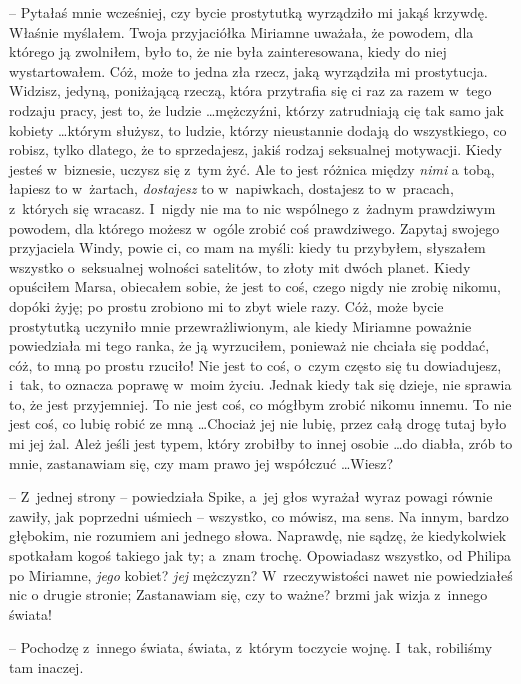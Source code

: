 \documentclass[oneside,polish,11pt,rmheadings]{mwbk}
\begin{document}
-- Pytałaś mnie wcześniej, czy bycie prostytutką wyrządziło mi jakąś krzywdę. Właśnie myślałem. Twoja przyjaciółka Miriamne uważała, że powodem, dla którego ją zwolniłem, było to, że nie była zainteresowana, kiedy do niej wystartowałem.  Cóż, może to jedna zła rzecz, jaką wyrządziła mi prostytucja. Widzisz, jedyną, poniżającą rzeczą, która przytrafia się ci raz za razem w~tego rodzaju pracy, jest to, że ludzie \ldots  mężczyźni, którzy zatrudniają cię tak samo jak kobiety \ldots  którym służysz, to ludzie, którzy nieustannie dodają do wszystkiego, co robisz, tylko dlatego, że to sprzedajesz, jakiś rodzaj seksualnej motywacji. Kiedy jesteś w~biznesie, uczysz się z~tym żyć. Ale to jest różnica między \textit{nimi }a tobą, łapiesz to w~żartach, \textit{dostajesz }to w~napiwkach, dostajesz to w~pracach, z~których się wracasz. I~nigdy nie ma to nic wspólnego z~żadnym prawdziwym powodem, dla którego możesz w~ogóle zrobić coś prawdziwego. Zapytaj swojego przyjaciela Windy, powie ci, co mam na myśli: kiedy tu przybyłem, słyszałem wszystko o~seksualnej wolności satelitów, to złoty mit dwóch planet. Kiedy opuściłem Marsa, obiecałem sobie, że jest to coś, czego nigdy nie zrobię nikomu, dopóki żyję; po prostu zrobiono mi to zbyt wiele razy. Cóż, może bycie prostytutką uczyniło mnie przewrażliwionym, ale kiedy Miriamne poważnie powiedziała mi tego ranka, że ją wyrzuciłem, ponieważ nie chciała się poddać, cóż, to mną po prostu rzuciło! Nie jest to coś, o~czym często się tu dowiadujesz, i~tak, to oznacza poprawę w~moim życiu. Jednak kiedy tak się dzieje, nie sprawia to, że jest przyjemniej. To nie jest coś, co mógłbym zrobić nikomu innemu. To nie jest coś, co lubię robić ze mną \ldots  Chociaż jej nie lubię, przez całą drogę tutaj było mi jej żal. Ależ jeśli jest typem, który zrobiłby to innej osobie \ldots  do diabła, zrób to mnie, zastanawiam się, czy mam prawo jej współczuć \ldots   Wiesz? 

-- Z~jednej strony -- powiedziała Spike, a~jej głos wyrażał wyraz powagi równie zawiły, jak poprzedni uśmiech -- wszystko, co mówisz, ma sens. Na innym, bardzo głębokim, nie rozumiem ani jednego słowa. Naprawdę, nie sądzę, że kiedykolwiek spotkałam kogoś takiego jak ty; a~znam trochę. Opowiadasz wszystko, od Philipa po Miriamne, \textit{jego }kobiet? \textit{jej } mężczyzn? W~rzeczywistości nawet nie powiedziałeś nic o drugie stronie;  Zastanawiam się, czy to ważne? brzmi jak wizja z~innego świata! 

-- Pochodzę z~innego świata, świata, z~którym toczycie wojnę. I~tak, robiliśmy tam inaczej. 
\end{document}
